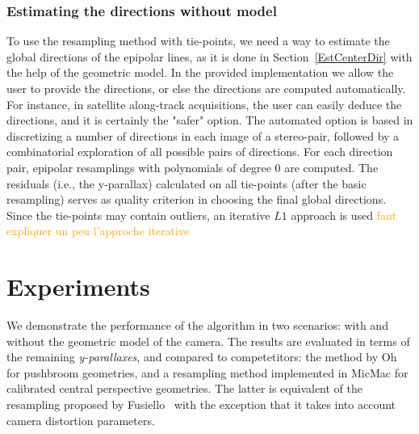 \documentclass{ipol}
\newcommand{\er}[1]{\textcolor{orange}{#1}}
\newcommand{\mpd}[1]{\textcolor{magenta}{#1}}
\begin{document}
\subsubsection{Estimating the directions without model}
%
To use the resampling method with tie-points, we need a way to estimate the global directions of the epipolar lines, as it is done in Section~\ref{EstCenterDir} with the help of the geometric model. In the provided implementation we allow the user to provide the directions, or else the directions are computed automatically. For instance, in satellite along-track acquisitions, the user can easily deduce the directions, and it is certainly the "safer" option. The automated option is based in discretizing a number of directions in each image of a stereo-pair, followed by a combinatorial exploration of all possible pairs of directions. For each direction pair, epipolar resamplings with polynomials of degree $0$ are computed. The residuals (i.e., the y-parallax) calculated on all tie-points (after the basic resampling) serves as quality criterion in choosing the final global directions. Since the tie-points may contain outliers, an iterative $L1$ approach is used \er{faut expliquer un peu l'approche iterative}






\section{Experiments}\label{sec:experiments}

We demonstrate the performance of the algorithm in two scenarios: with and without the geometric model of the camera. The results are evaluated in terms of the remaining \textit{y-parallaxes}, and compared to competetitors: the method by Oh~\cite{Oh2011} for pushbroom geometries, and a resampling method implemented in MicMac for calibrated central perspective geometries. The latter is equivalent of the resampling proposed by Fusiello~\cite{fusiello2000epi} with the exception that it takes into account camera distortion parameters.
%
\end{document}
